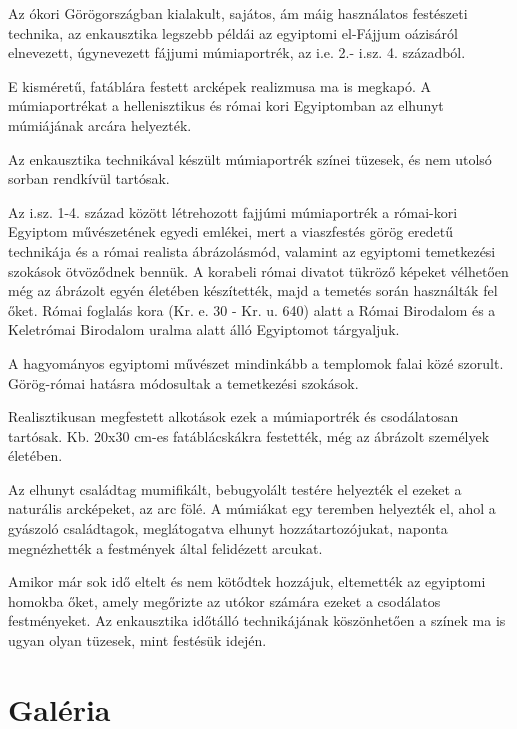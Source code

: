 Az ókori Görögországban kialakult, sajátos, ám máig használatos festészeti technika, az enkausztika legszebb példái az egyiptomi el-Fájjum oázisáról elnevezett, úgynevezett fájjumi múmiaportrék, az i.e. 2.- i.sz. 4. századból.

E kisméretű, fatáblára festett arcképek realizmusa ma is megkapó. A múmiaportrékat a hellenisztikus és római kori Egyiptomban az elhunyt múmiájának arcára helyezték.

Az enkausztika technikával készült múmiaportrék színei tüzesek, és nem utolsó sorban rendkívül tartósak.

Az i.sz. 1-4. század között létrehozott fajjúmi múmiaportrék a római-kori Egyiptom művészetének egyedi emlékei, mert a viaszfestés görög eredetű technikája és a római realista ábrázolásmód, valamint az egyiptomi temetkezési szokások ötvöződnek bennük. A korabeli római divatot tükröző képeket vélhetően még az ábrázolt egyén életében készítették, majd a temetés során használták fel őket. Római foglalás kora (Kr. e. 30 - Kr. u. 640) alatt a Római Birodalom és a Keletrómai Birodalom uralma alatt álló Egyiptomot tárgyaljuk.

A hagyományos egyiptomi művészet mindinkább a templomok falai közé szorult. Görög-római hatásra módosultak a temetkezési szokások.

Realisztikusan megfestett alkotások ezek a múmiaportrék és csodálatosan tartósak. Kb. 20x30 cm-es fatáblácskákra festették, még az ábrázolt személyek életében.

Az elhunyt családtag mumifikált, bebugyolált testére helyezték el ezeket a naturális arcképeket, az arc fölé. A múmiákat egy teremben helyezték el, ahol a gyászoló családtagok, meglátogatva elhunyt hozzátartozójukat, naponta megnézhették a festmények által felidézett arcukat.

Amikor már sok idő eltelt és nem kötődtek hozzájuk, eltemették az egyiptomi homokba őket, amely megőrizte az utókor számára ezeket a csodálatos festményeket. Az enkausztika időtálló technikájának köszönhetően a színek ma is ugyan olyan tüzesek, mint festésük idején.


\clearpage

\section{Galéria}

